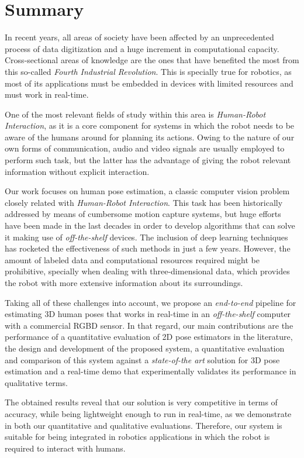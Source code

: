\chapter*{Summary}
In recent years, all areas of society have been affected by an unprecedented process of data digitization and a huge increment in computational capacity. Cross-sectional areas of knowledge are the ones that have benefited the most from this so-called \emph{Fourth Industrial Revolution}. This is specially true for robotics, as most of its applications must be embedded in devices with limited resources and must work in real-time.

One of the most relevant fields of study within this area is \emph{Human-Robot Interaction}, as it is a core component for systems in which the robot needs to be aware of the humans around for planning its actions. Owing to the nature of our own forms of communication, audio and video signals are usually employed to perform such task, but the latter has the advantage of giving the robot relevant information without explicit interaction.

Our work focuses on human pose estimation, a classic computer vision problem closely related with \emph{Human-Robot Interaction}. This task has been historically addressed by means of cumbersome motion capture systems, but huge efforts have been made in the last decades in order to develop algorithms that can solve it making use of \emph{off-the-shelf} devices. The inclusion of deep learning techniques has rocketed the effectiveness of such methods in just a few years. However, the amount of labeled data and computational resources required might be prohibitive, specially when dealing with three-dimensional data, which provides the robot with more extensive information about its surroundings.

Taking all of these challenges into account, we propose an \emph{end-to-end} pipeline for estimating 3D human poses that works in real-time in an \emph{off-the-shelf} computer with a commercial RGBD sensor. In that regard, our main contributions are the performance of a quantitative evaluation of 2D pose estimators in the literature, the design and development of the proposed system, a quantitative evaluation and comparison of this system against a \emph{state-of-the art} solution for 3D pose estimation and a real-time demo that experimentally validates its performance in qualitative terms.

The obtained results reveal that our solution is very competitive in terms of accuracy, while being lightweight enough to run in real-time, as we demonstrate in both our quantitative and qualitative evaluations. Therefore, our system is suitable for being integrated in robotics applications in which the robot is required to interact with humans.

